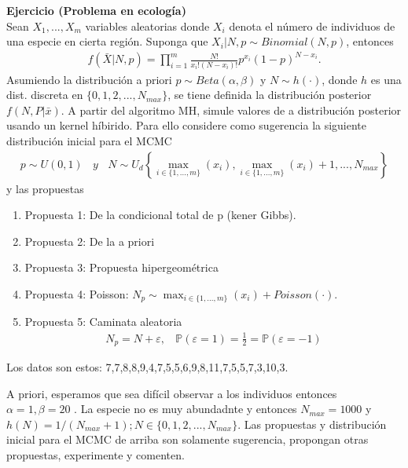 \documentclass[a4paper, 11pt]{article}
\newenvironment{problem}[2][Ejercicio]
{ \begin{mdframed}[backgroundcolor= red!50] \textbf{#1 #2} \\}
	{  \end{mdframed}}
\begin{document}
\begin{problem}{(Problema en ecología)} 
    Sean $X_1, ..., X_m$ variables aleatorias donde $X_i$ denota el número de individuos de una especie en cierta región. Suponga que $X_i|N,p\sim Binomial(N,p)$, entonces 
    \begin{align*}
        f(\bar{X}|N,p) = \prod_{i = 1}^{m} \frac{N!}{x_i!(N-x_i)!} p^{x_i}(1-p)^{N-x_i}.
    \end{align*}
    Asumiendo la distribución a priori $p\sim Beta(\alpha,\beta)$ y $N\sim h(\cdot)$, donde $h$ es una dist. discreta en $\{0,1,2,...,N_{max}\}$, se tiene definida la distribución posterior $f(N,P|\bar{x})$.
    A partir del algoritmo MH, simule valores de a distribución posterior usando un kernel híbirido. Para ello considere como sugerencia la siguiente distribución inicial para el MCMC 
    \begin{align*}
        p \sim U(0,1)   \:\:\:\: y \:\:\:\: N\sim U_d \left \{  \max_{i\in \{1,...,m\} } (x_i), \max_{i\in \{1,...,m\} } (x_i) + 1, ..., N_{max} \right \}
    \end{align*}
    y las propuestas
    \begin{enumerate}
        \item Propuesta 1: De la condicional total de p (kener Gibbs).
        \item Propuesta 2: De la a priori
        \item Propuesta 3: Propuesta hipergeométrica
        \item Propuesta 4: Poisson: $N_p \sim \max_{i \in \{1,...,m\} }(x_i) + Poisson(\cdot)$.
        \item Propuesta 5: Caminata aleatoria 
        \begin{align*}
            N_p = N + \varepsilon, \:\:\:\: \mathbb{P}\left (\varepsilon = 1 \right ) = \frac{1}{2} = \mathbb{P}\left (\varepsilon = -1 \right )    
        \end{align*}
    \end{enumerate}
    Los datos son estos: 7,7,8,8,9,4,7,5,5,6,9,8,11,7,5,5,7,3,10,3.

    A priori, esperamos que sea difícil observar a los individuos entonces $\alpha = 1, \beta = 20$ . La especie no es muy abundadnte y entonces $N_{max} = 1000$ y $h(N) = 1/(N_{max} +1); N \in \{0,1,2,...,N_{max}\}$.
    Las propuestas y distribución inicial para el MCMC de arriba son solamente sugerencia, propongan otras propuestas, experimente y comenten.
\end{problem}
\end{document}
